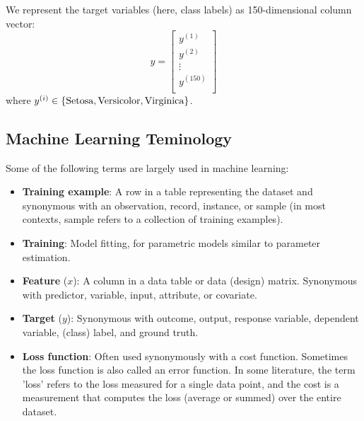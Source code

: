 \documentclass[../machine_learning_scikit.tex]{subfiles}
\begin{document}
    We represent the target variables (here, class labels) as 150-dimensional column vector:
    \begin{equation*}
        y=\left[ 
            \begin{array}{c}
                y^{(1)} \\
                y^{(2)} \\
                \vdots \\
                y^{(150)} \\
            \end{array}
        \right]
    \end{equation*}
    where $y^{(i)}\in\left\{\textup{Setosa},\textup{Versicolor},\textup{Virginica}\right\}$.

    \subsection{Machine Learning Teminology}

    \begin{mydef}
        Some of the following terms are largely used in machine learning:
        \begin{itemize}
            \item \textbf{Training example}: A row in a table representing the dataset and synonymous with an observation, record, instance, or sample (in most contexts, sample refers to a collection of training examples).

            \item \textbf{Training}: Model fitting, for parametric models similar to parameter estimation.

            \item \textbf{Feature} ($x$): A column in a data table or data (design) matrix. Synonymous with predictor, variable, input, attribute, or covariate.

            \item \textbf{Target} ($y$): Synonymous with outcome, output, response variable, dependent variable, (class) label, and ground truth.

            \item \textbf{Loss function}: Often used synonymously with a cost function. Sometimes the loss function is also called an error function. In some literature, the term 'loss' refers to the loss measured for a single data point, and the cost is a measurement that computes the loss (average or summed) over the entire dataset.
        \end{itemize}
    \end{mydef}
\end{document}
